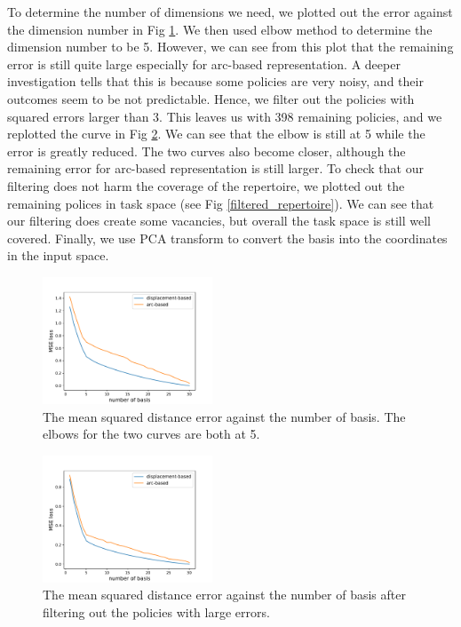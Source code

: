 To determine the number of dimensions we need, we plotted out the error against the dimension number in Fig \ref{original_elbow}.
We then used elbow method \cite{elbow} to determine the dimension number to be 5.
However, we can see from this plot that the remaining error is still quite large especially for arc-based representation.
A deeper investigation tells that this is because some policies are very noisy, and their outcomes seem to be not predictable.
Hence, we filter out the policies with squared errors larger than 3.
This leaves us with 398 remaining policies, and we replotted the curve in Fig \ref{filtered_elbow}.
We can see that the elbow is still at 5 while the error is greatly reduced.
The two curves also become closer, although the remaining error for arc-based representation is still larger.
To check that our filtering does not harm the coverage of the repertoire, we plotted out the remaining polices in task space (see Fig \ref{filtered_repertoire}).
We can see that our filtering does create some vacancies, but overall the task space is still well covered.
Finally, we use PCA transform to convert the basis into the coordinates in the input space.


\begin{figure}[h]
\centering
\includegraphics[width=0.45\textwidth]{elbow.pdf}
\caption{The mean squared distance error against the number of basis.
The elbows for the two curves are both at 5.  
}
\label{original_elbow}
\end{figure}


\begin{figure}[h]
\centering
\includegraphics[width=0.45\textwidth]{filtered_elbow.pdf}
\caption{The mean squared distance error against the number of basis after filtering out the policies with large errors.
}
\label{filtered_elbow}
\end{figure}

